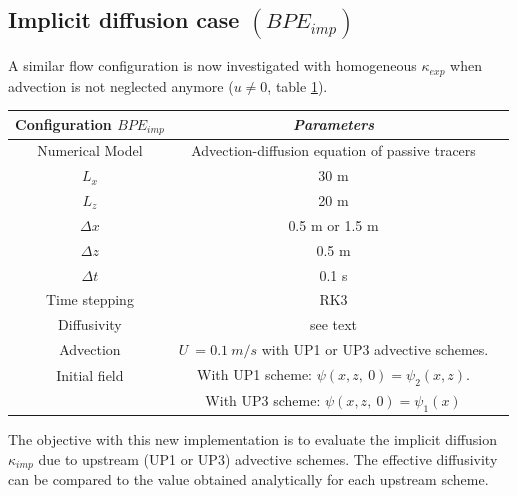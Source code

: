 \subsection{Implicit diffusion case $(BPE_{imp})$}
A similar flow configuration is now investigated with homogeneous $\kappa_{exp}$ when advection is not neglected anymore ($u \ne 0$, table \ref{tab_NUMLAB_imp}).
\begin{table}[h]
        \centering
        \begin{tabular}{|c|c|c|}
                \hline
                Configuration $BPE_{imp}$ & \textit{Parameters}\\
                \hline 
                Numerical Model & Advection-diffusion equation of passive tracers\\
                $L_x$ & 30 m\\
                $L_z$ & 20 m\\
                $\Delta x$ & 0.5 m or 1.5 m\\
                $\Delta z$ & 0.5 m\\
                $\Delta t$ & 0.1 s\\
                Time stepping & RK3 \\
                Diffusivity & see text \\
                Advection & $U\ = 0.1\ m/s$ with UP1 or UP3 advective schemes.\\
                Initial field & With UP1 scheme: $\psi(x, z,\ 0)=\psi_2(x,z)$. \\
                 & With UP3 scheme: $\psi(x, z,\ 0)=\psi_1(x)$\\
                \hline
        \end{tabular}
        \label{tab_NUMLAB_imp}
\end{table}
The objective with this new implementation is to evaluate the implicit diffusion $\kappa_{imp}$ due to upstream (UP1 or UP3) advective schemes. The effective diffusivity can be compared to the value obtained analytically for each upstream scheme. 

